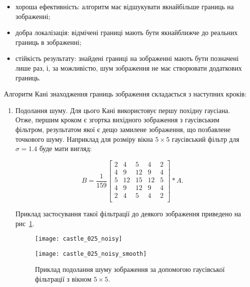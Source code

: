 \begin{itemize}
  \item хороша ефективність: алгоритм має відшукувати якнайбільше границь на зображенні;
  \item добра локалізація: відмічені границі мають бути якнайближче до реальних границь в зображенні;
  \item стійкість результату: знайдені границі на зображенні мають бути позначені лише раз, і, за можливістю, шум зображення не має створювати додаткових границь.
\end{itemize}

Алгоритм Кані знаходження границь зображення складається з наступних кроків: 

\begin{enumerate}
  \item Подолання шуму. Для цього Кані використовує першу похідну гаусіана. Отже, першим кроком є згортка вихідного зображення з гаусівським фільтром, результатом якої є дещо замилене зображення, що позбавлене точкового шуму. Наприклад для розміру вікна $5\times5$ гаусівський фільтр для $\sigma=1.4$ буде мати вигляд:

\begin{equation}
  B=\frac{1}{159} 
  \begin{bmatrix}
    2 & 4  & 5  & 4  & 2 \\
    4 & 9  & 12 & 9  & 4 \\
    5 & 12 & 15 & 12 & 5 \\
    4 & 9  & 12 & 9  & 4 \\
    2 & 4  & 5  & 4  & 2 \\
  \end{bmatrix}
  \ast A.
\end{equation}

Приклад застосування такої фільтрації до деякого зображення приведено на рис~\ref{fig:castle-smooth}.

\begin{figure}[h]
  \begin{minipage}[h]{0.49\linewidth}
    \texttt{[image: castle\_025\_noisy]}
  \end{minipage}
  \hfill
  \begin{minipage}[h]{0.49\linewidth}
    \texttt{[image: castle\_025\_noisy\_smooth]}
  \end{minipage}
  \caption{Приклад подолання шуму зображення за допомогою гаусівської фільтрації з вікном $5\times5$.}
  \label{fig:castle-smooth}
\end{figure}


\end{enumerate}
